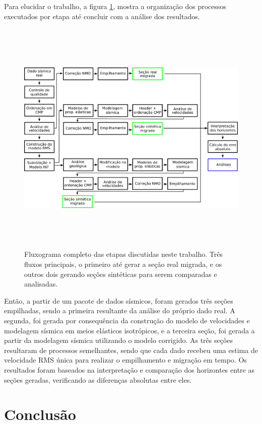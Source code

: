 \documentclass[
	12pt,				%
	openright,			%
	oneside,			%
	a4paper,			%
	english,			%
	brazil				%
	]{abntex2}
\begin{document}
	Para elucidar o trabalho, a figura \ref{fluxograma}, mostra a organização dos processos executados por etapa até concluir com a análise dos resultados. 

	\begin{figure}[htp!]
		\centering
		\includegraphics[width=16cm,height=11.5cm]{../imagens/fluxograma.png}
		\caption{Fluxograma completo das etapas discutidas neste trabalho. Três fluxos principais, o primeiro até gerar a seção real migrada, e os outros dois gerando seções sintéticas para serem comparadas e analisadas.}
		\label{fluxograma}
	\end{figure}

	Então, a partir de um pacote de dados sísmicos, foram gerados três seções empilhadas, sendo a primeira resultante da análise do próprio dado real. A segunda, foi gerada por consequência da construção do modelo de velocidades e modelagem sísmica em meios elásticos isotrópicos, e a terceira seção, foi gerada a partir da modelagem sísmica utilizando o modelo corrigido. As três seções resultaram de processos semelhantes, sendo que cada dado recebeu uma estima de velocidade RMS única para realizar o empilhamento e migração em tempo. Os resultados foram baseados na interpretação e comparação dos horizontes entre as seções geradas, verificando as diferenças absolutas entre eles. 

\chapter{Conclusão}
\end{document}
